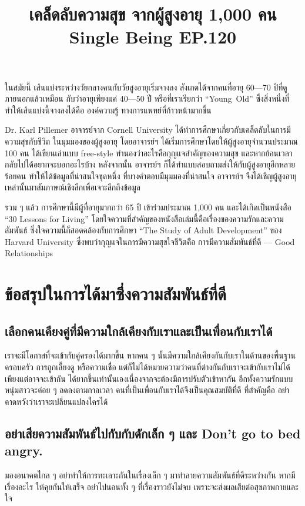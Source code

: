 \documentclass{article}
\title{\flushleft \textbf{เคล็ดลับความสุข จากผู้สูงอายุ 1,000 คน}\\
\large Single Being EP.120}
\author{}
\date{}
\begin{document}
\maketitle
\flushleft

ในสมัยนี้ เส้นแบ่งระหว่างวัยกลางคนกับวัยสูงอายุเริ่มจางลง สังเกตได้จากคนที่อายุ 60---70 ปีที่ดูภายนอกแล้วเหมือน
กับว่าอายุเพียงแค่ 40---50 ปี หรือที่เราเรียกว่า \mbox{``Young Old''} ซึ่งสิ่งหนึ่งที่ทำให้เส้นแบ่งนี้จางลงได้คือ องค์ความรู้
ทางการแพทย์ที่ก้าวหน้ามากขึ้น

\rule{0em}{1ex}

Dr. Karl Pillemer อาจารย์จาก Cornell University ได้ทำการศึกษาเกี่ยวกับเคล็ดลับในการมีความสุขกับชีวิต
ในมุมมองของผู้สูงอายุ โดยอาจารย์ฯ ได้เริ่มการศึกษาโดยให้ผู้สูงอายุจำนวนประมาณ 100 คน ได้เขียนเล่าแบบ
free-style ทำนองว่าอะไรคือกุญแจสำคัญของความสุข และหากย้อนเวลากลับไปได้อยากจะบอกอะไรบ้าง
หลังจากนั้น อาจารย์ฯ ก็ได้ทำแบบสอบถามส่งให้กับผู้สูงอายุอีกหลายร้อยคน ทำให้ได้ข้อมูลที่น่าสนใจชุดหนึ่ง
ที่บางคำตอบมีมุมมองที่น่าสนใจ อาจารย์ฯ จึงได้เชิญผู้สูงอายุเหล่านั้นมาสัมภาษณ์เชิงลึกเพื่อเจาะลึกถึงข้อมูล

\rule{0em}{1ex}

รวม ๆ แล้ว การศึกษานี้มีผู้ที่อายุมากกว่า 65 ปี เข้าร่วมประมาณ 1,000 คน และได้เกิดเป็นหนังสือ
``30 Lessons for Living'' โดยใจความที่สำคัญของหนังสือเล่มนี้คือเรื่องของความรักและความสัมพันธ์
ซึ่งใจความนี้ก็สอดคล้องกับการศึกษา ``The Study of Adult Development'' ของ Harvard University
ซึ่งพบว่ากุญแจในการมีความสุขใจชีวิตค่ือ การมีความสัมพันธ์ที่ดี --- Good Relationships

\rule{0em}{1ex}

\section*{ข้อสรุปในการได้มาซึ่งความสัมพันธ์ที่ดี}


\subsection*{เลือกคนเคียงคู่ที่มีความใกล้เคียงกับเราและเป็นเพื่อนกับเราได้}
เราจะมีโอกาสที่จะเข้ากับคู่ครองได้มากขึ้น หากคน ๆ นั้นมีความใกล้เคียงกันกับเราในด้านของพื้นฐานครอบครัว
การถูกเลี้ยงดู หรือความเชื่อ แต่ก็ไม่ได้หมายความว่าคนที่ต่างกันกับเราจะเข้ากับเราไม่ได้ เพียงแต่อาจจะเข้ากัน
ได้ยากขึ้นเท่านั้นเองเนื่องจากจะต้องมีการปรับตัวเข้าหากัน อีกทั้งความรักแบบหนุ่มสาวจะค่อย ๆ ลดลงตามกาลเวลา 
คนที่เป็นเพื่อนกับเราได้จึงเป็นคุณสมบัติที่ดี ที่สำคัญคือ อย่าคาดหวังว่าเราจะเปลี่ยนแปลงใครได้

\subsection*{อย่าเสียความสัมพันธ์ไปกับกับดักเล็ก ๆ และ Don't go to bed angry.}
มองอนาคตไกล ๆ อย่าทำให้การทะเลาะกันในเรื่องเล็ก ๆ มาทำลายความสัมพันธ์ที่ดีระหว่างกัน
หากมีเรื่องอะไร ให้คุยกันให้เสร็จ อย่าไปนอนทั้ง ๆ ที่เรื่องราวยังไม่จบ เพราะจะส่งผลเสียต่อสุขภาพกายและใจ
\end{document}
